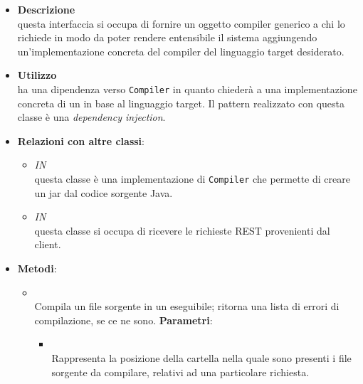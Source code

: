 \begin{itemize}
\item \textbf{Descrizione}\\
questa interfaccia si occupa di fornire un oggetto compiler generico a chi lo richiede in modo da poter rendere entensibile il sistema aggiungendo un'implementazione concreta del compiler del linguaggio target desiderato.
\item \textbf{Utilizzo}\\
 ha una dipendenza verso \texttt{Compiler} in quanto chiederà a  una implementazione concreta di un  in base al linguaggio target. Il pattern realizzato con questa classe è una \emph{dependency injection}.
\item \textbf{Relazioni con altre classi}:
\begin{itemize}
\item \textit{IN} \hyperref[\nogloxy{swedesigner::server::compiler::java::JavaCompiler}]{}\\
questa classe è una implementazione di \texttt{Compiler} che permette di creare un jar dal codice sorgente Java.
\item \textit{IN} \hyperref[\nogloxy{swedesigner::server::controller::RequestHandlerController}]{}\\
questa classe si occupa di ricevere le richieste REST provenienti dal client.
\end{itemize}
\item \textbf{Metodi}:
\begin{itemize}
\item {}
\\ Compila un file sorgente in un eseguibile; ritorna una lista di errori di compilazione, se ce ne sono.
\textbf{Parametri}:
\begin{itemize}
\item {}
\\ Rappresenta la posizione della cartella nella quale sono presenti i file sorgente da compilare, relativi ad una particolare richiesta.
\end{itemize}
\end{itemize}
\end{itemize}
\subsection{}
\label{\nogloxy{swedesigner::server::compiler::java}}
